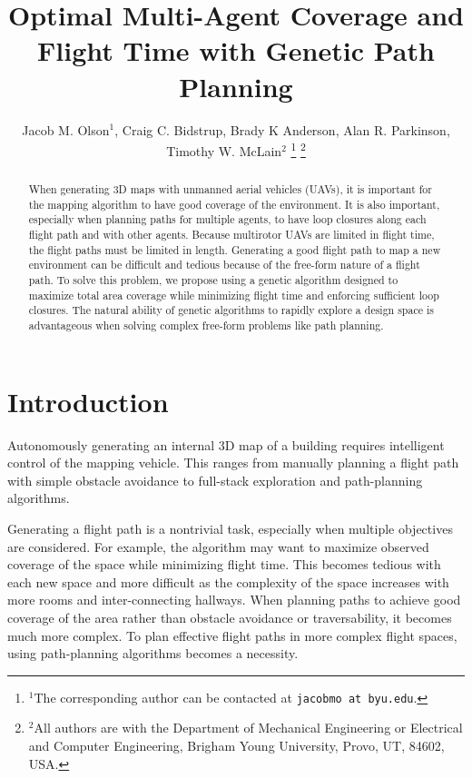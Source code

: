 \documentclass[letterpaper, 10 pt, conference]{ieeeconf}  %
\title{\LARGE \bf
Optimal Multi-Agent Coverage and Flight Time \linebreak with Genetic Path Planning
}
\author{Jacob M. Olson$^{1}$, Craig C. Bidstrup, Brady K Anderson, Alan R. Parkinson, Timothy W. McLain$^{2}$%
\thanks{$^{1}$The corresponding author can be contacted at
        {\tt\small jacobmo at byu.edu}.}%
\thanks{$^{2}$All authors are with the Department of Mechanical Engineering or Electrical and Computer Engineering,
        Brigham Young University, Provo, UT, 84602, USA.}%
}
\begin{document}
\maketitle
\thispagestyle{empty}
\pagestyle{empty}

\graphicspath{{figures/}}

\begin{abstract}

When generating 3D maps with unmanned aerial vehicles (UAVs), it is important for the mapping algorithm to have good coverage of the environment. It is also important, especially when planning paths for multiple agents, to have loop closures along each flight path and with other agents. Because multirotor UAVs are limited in flight time, the flight paths must be limited in length. Generating a good flight path to map a new environment can be difficult and tedious because of the free-form nature of a flight path. To solve this problem, we propose using a genetic algorithm designed to maximize total area coverage while minimizing flight time and enforcing sufficient loop closures. The natural ability of genetic algorithms to rapidly explore a design space is advantageous when solving complex free-form problems like path planning.

\end{abstract}

\section{Introduction}

Autonomously generating an internal 3D map of a building requires intelligent control of the mapping vehicle. This ranges from manually planning a flight path with simple obstacle avoidance to full-stack exploration and path-planning algorithms.

Generating a flight path is a nontrivial task, especially when multiple objectives are considered. For example, the algorithm may want to maximize observed coverage of the space while minimizing flight time. This becomes tedious with each new space and more difficult as the complexity of the space increases with more rooms and inter-connecting hallways. When planning paths to achieve good coverage of the area rather than obstacle avoidance or traversability, it becomes much more complex. To plan effective flight paths in more complex flight spaces, using path-planning algorithms becomes a necessity.
\end{document}
